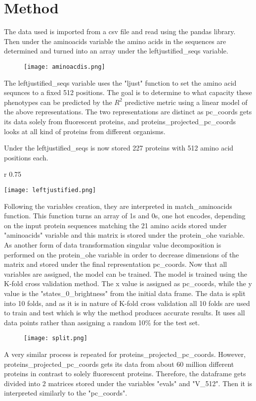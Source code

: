 \documentclass{article}
\begin{document}
\section{Method}
The data used is imported from a csv file and read using the pandas library. Then under the aminoacids variable the amino acids in the sequences are determined and turned into an array under the leftjustified\_seqs variable. 
\begin{figure}[h]
    \centering
    \texttt{[image: aminoacdis.png]}
    \label{fig:enter-label}
\end{figure}
The leftjustified\_seqs variable uses the "ljust" function to set the amino acid sequnces to a fixed 512 positions. The goal is to determine to what capacity these phenotypes can be predicted by the $R^2$ predictive metric using a linear model of the above representations. The two representations are distinct as pc\_coords gets its data solely from fluorescent proteins, and proteins\_projected\_pc\_coords looks at all kind of proteins from different organisms.\par
Under the leftjustified\_seqs is now stored 227 proteins with 512 amino acid positions each. 
\begin{wrapfigure}{r} {0.75\textwidth}
    \begin{center}
     \texttt{[image: leftjustified.png]}
    \end{center}
\end{wrapfigure}
Following the variables creation, they are interpreted in match\_aminoacids function. This function turns an array of 1s and 0s, one hot encodes, depending on 
the input protein sequences matching the 21 amino acids stored under "aminoacids" variable and this matrix is stored under the protein\_ohe variable. As another form of data transformation singular value decomposition is performed on the protein\_ohe variable in order to decrease dimensions of the matrix 
and stored under the final representation pc\_coords. Now that all variables are assigned, the model can be trained. The model is trained using the K-fold cross validation method. The x value is assigned as pc\_coords, while the y value is the "states\_0\_brightness" from the initial data frame. 
The data is split into 10 folds, and as it is in nature of K-fold cross validation all 10 folds are used to train and test which is why the method produces accurate results. It uses all data points rather than assigning a random 10\% for the test set. \par
\begin{figure} [h]
    \centering
    \texttt{[image: split.png]}
    \label{fig:enter-label}
\end{figure}
A very similar process is repeated for proteins\_projected\_pc\_coords. However, proteins\_projected\_pc\_coords gets its data from about 60 million different proteins in contrast to solely fluorescent proteins. Therefore, the dataframe gets divided into 2 matrices stored under the variables "evals" and "V\_512". Then it is interpreted similarly to the "pc\_coords".\par
\end{document}
